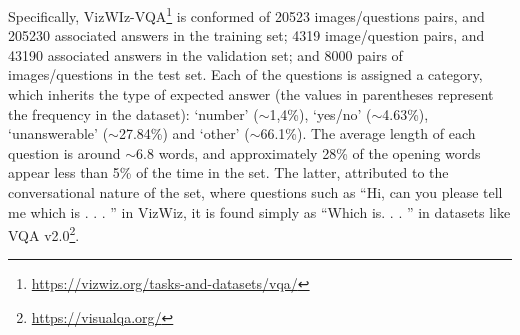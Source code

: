 
Specifically, VizWIz-VQA\footnote {\url{https://vizwiz.org/tasks-and-datasets/vqa/}} is conformed of 20523 images/questions pairs, and 205230 associated answers in the training set; 4319 image/question pairs, and 43190 associated answers in the validation set; and 8000 pairs of images/questions in the test set. Each of the questions is assigned a category, which inherits the type of expected answer (the values in parentheses represent the frequency in the dataset): `number' ($\sim$1,4\%), `yes/no' ($\sim$4.63\%), `unanswerable' ($\sim$27.84\%) and `other' ($\sim$66.1\%).
The average length of each question is around $\sim$6.8 words, and approximately 28\% of the opening words appear less than 5\% of the time in the set. The latter, attributed to the conversational nature of the set, where questions such as ``Hi, can you please tell me which is . . . '' in VizWiz, it is found simply as ``Which is. . . '' in datasets like VQA v2.0\footnote{\url{https://visualqa.org/}}.

